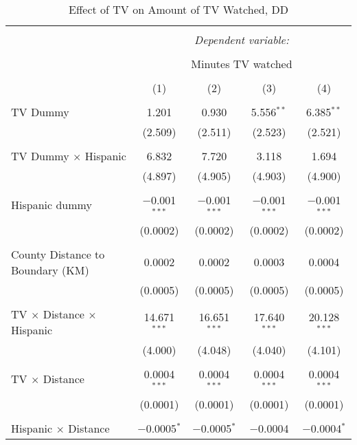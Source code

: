 
\begin{table}[!htbp] \centering 
  \caption{Effect of TV on Amount of TV Watched, DD} 
  \label{} 
\begin{tabular}{@{\extracolsep{-5pt}}lcccc} 
\\[-1.8ex]\hline 
\hline \\[-1.8ex] 
 & \multicolumn{4}{c}{\textit{Dependent variable:}} \\ 
\cline{2-5} 
\\[-1.8ex] & \multicolumn{4}{c}{Minutes TV watched} \\ 
\\[-1.8ex] & (1) & (2) & (3) & (4)\\ 
\hline \\[-1.8ex] 
 TV Dummy & 1.201 & 0.930 & 5.556$^{**}$ & 6.385$^{**}$ \\ 
  & (2.509) & (2.511) & (2.523) & (2.521) \\ 
  & & & & \\ 
 TV Dummy $\times$ Hispanic  & 6.832 & 7.720 & 3.118 & 1.694 \\ 
  & (4.897) & (4.905) & (4.903) & (4.900) \\ 
  & & & & \\ 
 Hispanic dummy & $-$0.001$^{***}$ & $-$0.001$^{***}$ & $-$0.001$^{***}$ & $-$0.001$^{***}$ \\ 
  & (0.0002) & (0.0002) & (0.0002) & (0.0002) \\ 
  & & & & \\ 
 County Distance to Boundary (KM) & 0.0002 & 0.0002 & 0.0003 & 0.0004 \\ 
  & (0.0005) & (0.0005) & (0.0005) & (0.0005) \\ 
  & & & & \\ 
 TV $\times$ Distance $\times$ Hispanic & 14.671$^{***}$ & 16.651$^{***}$ & 17.640$^{***}$ & 20.128$^{***}$ \\ 
  & (4.000) & (4.048) & (4.040) & (4.101) \\ 
  & & & & \\ 
 TV $\times$ Distance & 0.0004$^{***}$ & 0.0004$^{***}$ & 0.0004$^{***}$ & 0.0004$^{***}$ \\ 
  & (0.0001) & (0.0001) & (0.0001) & (0.0001) \\ 
  & & & & \\ 
 Hispanic $\times$ Distance & $-$0.0005$^{*}$ & $-$0.0005$^{*}$ & $-$0.0004 & $-$0.0004$^{*}$ \\ 

\end{tabular}
\end{table}
